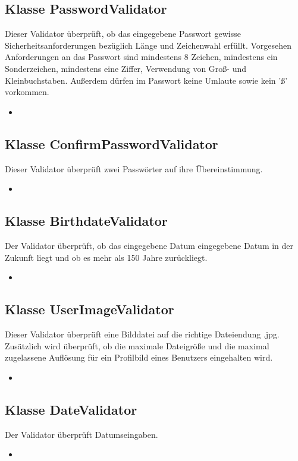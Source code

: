 \documentclass[a4paper]{scrreprt}
\begin{document}
	\subsection{Klasse PasswordValidator}
	Dieser Validator überprüft, ob das eingegebene Passwort gewisse Sicherheitsanforderungen bezüglich Länge und Zeichenwahl erfüllt. Vorgesehen Anforderungen an das Passwort sind mindestens 8 Zeichen, mindestens ein Sonderzeichen, mindestens eine Ziffer, Verwendung von Groß- und Kleinbuchstaben. Außerdem dürfen im Passwort keine Umlaute sowie kein 'ß' vorkommen.
	\begin{itemize}
		\item \override
	\end{itemize}
	
	\subsection{Klasse ConfirmPasswordValidator}
	Dieser Validator überprüft zwei Passwörter auf ihre Übereinstimmung.
	\begin{itemize}
		\item \override
	\end{itemize}
	
	\subsection{Klasse BirthdateValidator}
	Der Validator überprüft, ob das eingegebene Datum eingegebene Datum in der Zukunft liegt und ob es mehr als 150 Jahre zurückliegt.
	\begin{itemize}
		\item \override
	\end{itemize}
	
	\subsection{Klasse UserImageValidator}
	Dieser Validator überprüft eine Bilddatei auf die richtige Dateiendung .jpg. Zusätzlich wird überprüft, ob
	die maximale Dateigröße und die maximal zugelassene Auflösung für ein Profilbild eines Benutzers eingehalten wird.
	\begin{itemize}
		\item \override
	\end{itemize}
	
    \subsection{Klasse DateValidator}
    Der Validator überprüft Datumseingaben.
    \begin{itemize}
	    \item \override
    \end{itemize}
    
\end{document}
